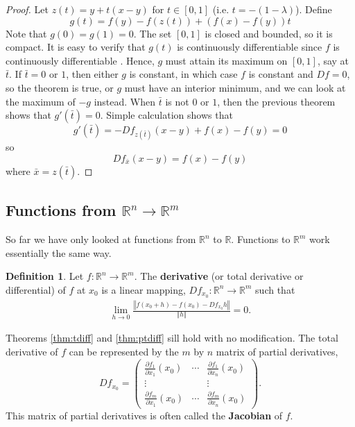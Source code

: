 \documentclass[12pt,reqno]{amsart}
\theoremstyle{definition}
\newtheorem{definition}{Definition}[section]
\def\R{\mathbb{R}}
\newcommand{\norm}[1]{\left\Vert {#1} \right\Vert}
\renewcommand{\to}{{\rightarrow}}
\begin{document}
\begin{proof}
  Let $z(t) = y + t(x-y)$ for $t \in [0,1]$ (i.e.
  $t=-(1-\lambda)$). Define
  \[ g(t) = f(y) - f(z(t)) + \left(f(x) - f(y)\right) t \] Note that
  $g(0) = g(1) = 0$. The set $[0,1]$ is closed and bounded, so it is
  compact. It is easy to verify that $g(t)$ is continuously
  differentiable since $f$ is continuously differentiable . Hence, $g$
  must attain its maximum on $[0,1]$, say at $\bar{t}$. If $\bar{t} =
  0$ or $1$, then either $g$ is constant, in which case $f$ is
  constant and $Df = 0$, so the theorem is true, or $g$ must have an
  interior minimum, and we can look at the maximum of $-g$
  instead. When $\bar{t}$ is not $0$ or $1$, then the previous theorem
  shows that $g'(\bar{t}) = 0$. Simple calculation shows that
  \[ g'(\bar{t}) = -Df_{z(\bar{t})} (x-y) +  f(x) - f(y) = 0 \]
  so 
  \[ Df_{\bar{x}}(x-y) = f(x) - f(y) \]
  where $\bar{x} = z(\bar{t})$.
\end{proof}

\subsection{Functions from $\R^n \to \R^m$}

So far we have only looked at functions from $\R^n$ to $\R$. Functions
to $\R^m$ work essentially the same way. 
\begin{definition}
  Let $f: \R^n \to \R^m$. The \textbf{derivative} (or total derivative
  or differential) of $f$ at $x_0$ is a linear mapping, $Df_{x_0}:
  \R^n \to \R^m$ such that
  \begin{align*}
    \lim_{h \to 0} \frac{\left\Vert f(x_0 + h) - f(x_0) - Df_{x_0}
        h\right\Vert} {\norm{h}} = 0. 
  \end{align*}
\end{definition}
Theorems \ref{thm:tdiff} and \ref{thm:ptdiff} sill hold with no
modification. The total derivative of $f$ can be represented by the
$m$ by $n$ matrix of partial derivatives,
\[ Df_{x_0}  = \begin{pmatrix} \frac{\partial f_1}{\partial x_1}(x_0) &
  \cdots & \frac{\partial f_1}{\partial x_n}(x_0) \\
  \vdots & & \vdots \\
  \frac{\partial f_m}{\partial x_1}(x_0) & \cdots & \frac{\partial
    f_m}{\partial x_n}(x_0)  
\end{pmatrix}. \] 
This matrix of partial derivatives is often called
the \textbf{Jacobian} of $f$. 
\end{document}
